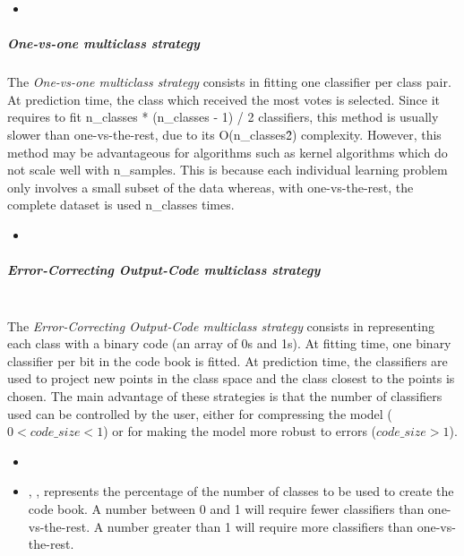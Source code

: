 \begin{itemize}
  \item \estimatorDescription{}
\end{itemize}

\subparagraph{One-vs-one multiclass strategy}
\mbox{}

The \textit{One-vs-one multiclass strategy} consists in fitting one classifier
per class pair.
%
At prediction time, the class which received the most votes is selected.
%
Since it requires to fit n\_classes * (n\_classes - 1) / 2 classifiers, this
method is usually slower than one-vs-the-rest, due to its O(n\_classes\^2)
complexity.
%
However, this method may be advantageous for algorithms such as kernel
algorithms which do not scale well with n\_samples.
%
This is because each individual learning problem only involves a small subset of
the data whereas, with one-vs-the-rest, the complete dataset is used n\_classes
times.

\begin{itemize}
  \item \estimatorDescription{}
\end{itemize}

\subparagraph{Error-Correcting Output-Code multiclass strategy}
\mbox{}
\\The \textit{Error-Correcting Output-Code multiclass strategy} consists in
representing each class with a binary code (an array of 0s and 1s).
%
At fitting time, one binary classifier per bit in the code book is fitted.
%
At prediction time, the classifiers are used to project new points in the class
space and the class closest to the points is chosen.
%
The main advantage of these strategies is that the number of classifiers used
can be controlled by the user, either for compressing the model ($0 < code\_
size < 1$) or for making the model more robust to errors ($code\_ size > 1$).

\begin{itemize}
  \item \estimatorDescription{}
  \item {}, , represents the
  percentage of the number of classes to be used to create the code book.
  A number between 0 and 1 will require fewer classifiers than one-vs-the-rest.
  A number greater than 1 will require more classifiers than one-vs-the-rest.
\end{itemize}

